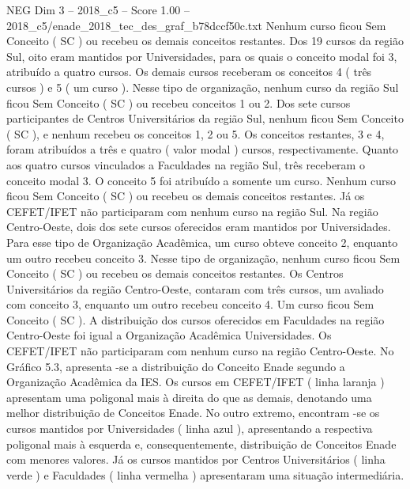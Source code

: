 \begin{textsample}{NEG Dim 3 – 2018\_c5 – Score 1.00 – 2018\_c5/enade\_2018\_tec\_des\_graf\_b78dccf50c.txt}
Nenhum curso ficou Sem Conceito ( SC ) ou recebeu os demais conceitos restantes.
Dos 19 cursos da região Sul, oito eram mantidos por Universidades, para os quais o conceito modal foi 3, atribuído a quatro cursos.
Os demais cursos receberam os conceitos 4 ( três cursos ) e 5 ( um curso ).
Nesse tipo de organização, nenhum curso da região Sul ficou Sem Conceito ( SC ) ou recebeu conceitos 1 ou 2.
Dos sete cursos participantes de Centros Universitários da região Sul, nenhum ficou Sem Conceito ( SC ), e nenhum recebeu os conceitos 1, 2 ou 5.
Os conceitos restantes, 3 e 4, foram atribuídos a três e quatro ( valor modal ) cursos, respectivamente.
Quanto aos quatro cursos vinculados a Faculdades na região Sul, três receberam o conceito modal 3.
O conceito 5 foi atribuído a somente um curso.
Nenhum curso ficou Sem Conceito ( SC ) ou recebeu os demais conceitos restantes.
Já os CEFET/IFET não participaram com nenhum curso na região Sul.
Na região Centro-Oeste, dois dos sete cursos oferecidos eram mantidos por Universidades.
Para esse tipo de Organização Acadêmica, um curso obteve conceito 2, enquanto um outro recebeu conceito 3.
Nesse tipo de organização, nenhum curso ficou Sem Conceito ( SC ) ou recebeu os demais conceitos restantes.
Os Centros Universitários da região Centro-Oeste, contaram com três cursos, um avaliado com conceito 3, enquanto um outro recebeu conceito 4.
Um curso ficou Sem Conceito ( SC ).
A distribuição dos cursos oferecidos em Faculdades na região Centro-Oeste foi igual a Organização Acadêmica Universidades.
Os CEFET/IFET não participaram com nenhum curso na região Centro-Oeste.
No Gráfico 5.3, apresenta -se a distribuição do Conceito Enade segundo a Organização Acadêmica da IES.
Os cursos em CEFET/IFET ( linha laranja ) apresentam uma poligonal mais à direita do que as demais, denotando uma melhor distribuição de Conceitos Enade.
No outro extremo, encontram -se os cursos mantidos por Universidades ( linha azul ), apresentando a respectiva poligonal mais à esquerda e, consequentemente, distribuição de Conceitos Enade com menores valores.
Já os cursos mantidos por Centros Universitários ( linha verde ) e Faculdades ( linha vermelha ) apresentaram uma situação intermediária.

\end{textsample}
